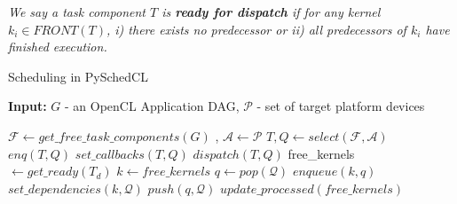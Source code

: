     \begin{definition}
        \emph{We say a task component $T$ is \textbf{ready for dispatch} if for any kernel $k_i \in FRONT(T)$, i) there exists no predecessor or ii) all predecessors of $k_i$ have finished execution.}
    \end{definition} 

    \begin{algorithm}[H]
		
		\caption{Scheduling in PySchedCL\label{algo:dispatch}}
		\textbf{Input: } $G$ - an OpenCL Application DAG, $\mathcal{P}$ - set of target platform devices
		\begin{algorithmic}[1]
			\State $\mathcal{F} \leftarrow get\_free\_task\_components(G)$ , $\mathcal{A} \leftarrow \mathcal{P}$
			\State $T,Q \leftarrow select(\mathcal{F},\mathcal{A})$
			\State $enq(T,Q)$
			\State $set\_callbacks(T,Q)$
			\State $dispatch(T,Q)$
			\EndWhile
			\EndWhile
			\EndProcedure
			\State free\_kernels $\leftarrow get\_ready(T_d)$
			\State $k \leftarrow free\_kernels$
			\State $q \leftarrow pop(\mathcal{Q})$
			\State $enqueue(k,q)$
			\State $set\_dependencies(k,\mathcal{Q})$
			\State $push(q,\mathcal{Q})$
			\State $update\_processed(free\_kernels)$
			\EndWhile
			\EndFunction
		\end{algorithmic}
	\end{algorithm}

    
   
